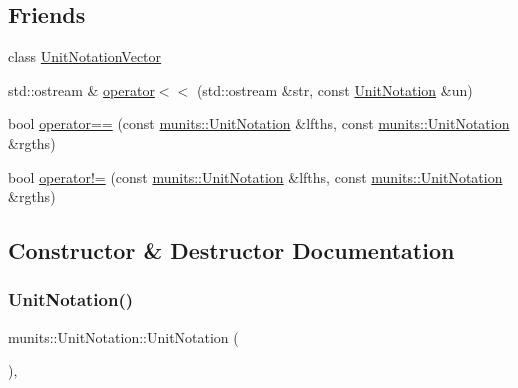 \subsection*{Friends}
\begin{DoxyCompactItemize}
\item 
class \hyperlink{classmunits_1_1_unit_notation_a816f3ddc8b55e7f959db7e1a15ea4619}{Unit\+Notation\+Vector}
\item 
std\+::ostream \& \hyperlink{classmunits_1_1_unit_notation_a74ccfa8c716808f13917e86dd12cd186}{operator$<$$<$} (std\+::ostream \&str, const \hyperlink{classmunits_1_1_unit_notation}{Unit\+Notation} \&un)
\item 
bool \hyperlink{classmunits_1_1_unit_notation_ab7df41558423a5897c18119d31624f90}{operator==} (const \hyperlink{classmunits_1_1_unit_notation}{munits\+::\+Unit\+Notation} \&lfths, const \hyperlink{classmunits_1_1_unit_notation}{munits\+::\+Unit\+Notation} \&rgths)
\item 
bool \hyperlink{classmunits_1_1_unit_notation_af8528c1eb2d20c91b5bae0fd7498a4bf}{operator!=} (const \hyperlink{classmunits_1_1_unit_notation}{munits\+::\+Unit\+Notation} \&lfths, const \hyperlink{classmunits_1_1_unit_notation}{munits\+::\+Unit\+Notation} \&rgths)
\end{DoxyCompactItemize}


\subsection{Constructor \& Destructor Documentation}
\mbox{\label{classmunits_1_1_unit_notation_a9ae99972c9d065feb0805e6ddf0aa5e8}} 
\subsubsection{\texorpdfstring{Unit\+Notation()}{UnitNotation()}\hspace{0.1cm}{\footnotesize\ttfamily [1/3]}}
{\footnotesize\ttfamily munits\+::\+Unit\+Notation\+::\+Unit\+Notation (\begin{DoxyParamCaption}{ }\end{DoxyParamCaption})\hspace{0.3cm}{\ttfamily [inline]}, {\ttfamily [explicit]}}

\mbox{\label{classmunits_1_1_unit_notation_a1e2eebf9c54bb96b33681d820b69e255}} 
